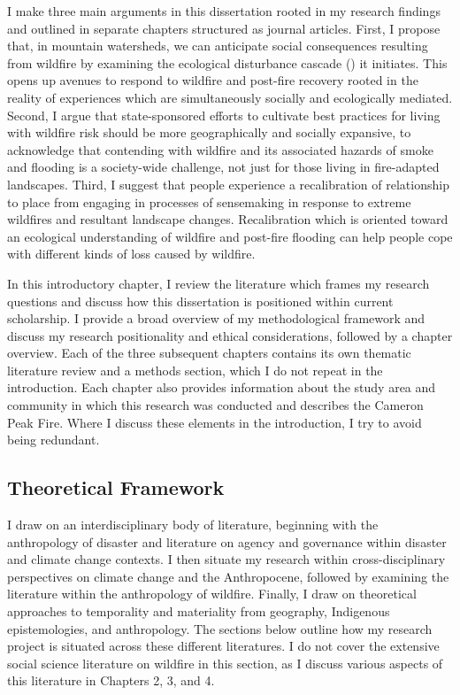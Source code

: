 \documentclass[
]{article}
\begin{document}
I make three main arguments in this dissertation rooted in my research findings and outlined in separate chapters structured as journal articles. First, I propose that, in mountain watersheds, we can anticipate social consequences resulting from wildfire by examining the ecological disturbance cascade () it initiates. This opens up avenues to respond to wildfire and post-fire recovery rooted in the reality of experiences which are simultaneously socially and ecologically mediated. Second, I argue that state-sponsored efforts to cultivate best practices for living with wildfire risk should be more geographically and socially expansive, to acknowledge that contending with wildfire and its associated hazards of smoke and flooding is a society-wide challenge, not just for those living in fire-adapted landscapes. Third, I suggest that people experience a recalibration of relationship to place from engaging in processes of sensemaking in response to extreme wildfires and resultant landscape changes. Recalibration which is oriented toward an ecological understanding of wildfire and post-fire flooding can help people cope with different kinds of loss caused by wildfire.

In this introductory chapter, I review the literature which frames my research questions and discuss how this dissertation is positioned within current scholarship. I provide a broad overview of my methodological framework and discuss my research positionality and ethical considerations, followed by a chapter overview. Each of the three subsequent chapters contains its own thematic literature review and a methods section, which I do not repeat in the introduction. Each chapter also provides information about the study area and community in which this research was conducted and describes the Cameron Peak Fire. Where I discuss these elements in the introduction, I try to avoid being redundant.

\subsection{Theoretical Framework}\label{theoretical-framework}

I draw on an interdisciplinary body of literature, beginning with the anthropology of disaster and literature on agency and governance within disaster and climate change contexts. I then situate my research within cross-disciplinary perspectives on climate change and the Anthropocene, followed by examining the literature within the anthropology of wildfire. Finally, I draw on theoretical approaches to temporality and materiality from geography, Indigenous epistemologies, and anthropology. The sections below outline how my research project is situated across these different literatures. I do not cover the extensive social science literature on wildfire in this section, as I discuss various aspects of this literature in Chapters 2, 3, and 4.
\end{document}
